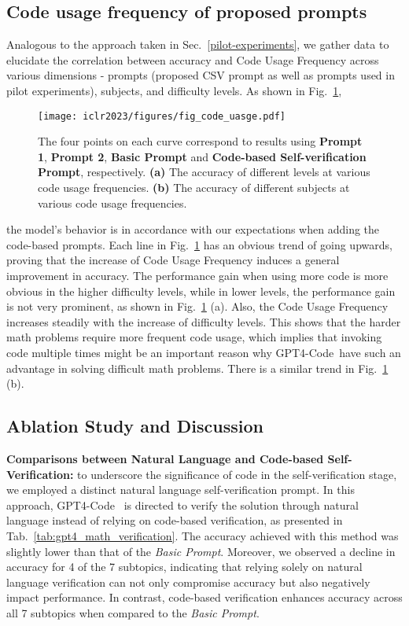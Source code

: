 \documentclass{article} \usepackage{iclr2023_conference,times}
\newcommand{\gptcode}{GPT4-Code}
\begin{document}
\subsection{Code usage frequency of proposed prompts}

Analogous to the approach taken in Sec.~\ref{pilot-experiments}, we gather data to elucidate the correlation between accuracy and Code Usage Frequency across various dimensions - prompts (proposed CSV prompt as well as prompts used in pilot experiments), subjects, and difficulty levels. As shown in Fig.~\ref{fig:code-frequency}, 
\begin{figure}[t]
    \centering
    \texttt{[image: iclr2023/figures/fig\_code\_uasge.pdf]}
    \vspace{-4mm}
    \caption{The four points on each curve correspond to results using \textbf{Prompt 1}, \textbf{Prompt 2}, \textbf{Basic Prompt} and \textbf{Code-based Self-verification Prompt}, respectively. \textbf{(a)} The accuracy of different levels at various code usage frequencies. \textbf{(b)} The accuracy of different subjects at various code usage frequencies.}
\label{fig:code-frequency}
\end{figure}
the model's behavior is in accordance with our expectations when adding the code-based prompts. Each line in Fig.~\ref{fig:code-frequency} has an obvious trend of going upwards, proving that the increase of Code Usage Frequency induces a general improvement in accuracy. The performance gain when using more code is more obvious in the higher difficulty levels, while in lower levels, the performance gain is not very prominent, as shown in Fig.~\ref{fig:code-frequency} (a). Also, the Code Usage Frequency increases steadily with the increase of difficulty levels. This shows that the harder math problems require more frequent code usage, which implies that invoking code multiple times might be an important reason why \gptcode~have such an advantage in solving difficult math problems. There is a similar trend in Fig.~\ref{fig:code-frequency} (b).

\subsection{Ablation Study and Discussion}

\textbf{Comparisons between Natural Language and Code-based Self-Verification:} to underscore the significance of code in the self-verification stage, we employed a distinct natural language self-verification prompt. In this approach, \gptcode ~ is directed to verify the solution through natural language instead of relying on code-based verification, as presented in Tab.~\ref{tab:gpt4_math_verification}. The accuracy achieved with this method was slightly lower than that of the \textit{Basic Prompt}. Moreover, we observed a decline in accuracy for 4 of the 7 subtopics, indicating that relying solely on natural language verification can not only compromise accuracy but also negatively impact performance. In contrast, code-based verification enhances accuracy across all 7 subtopics when compared to the \textit{Basic Prompt}.
\end{document}
